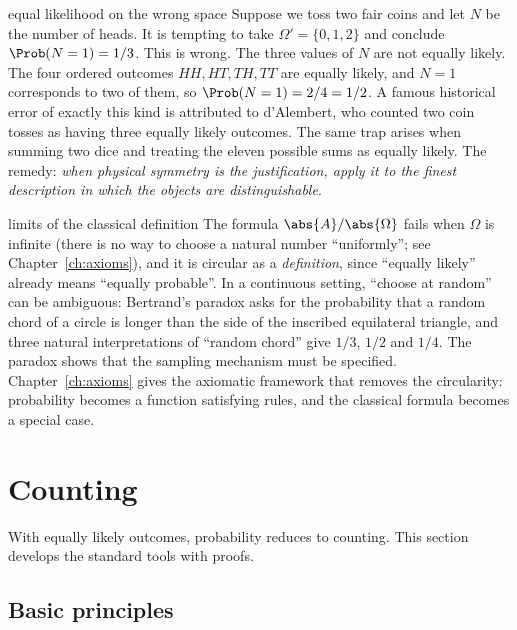 \begin{pitfall}{equal likelihood on the wrong space}
Suppose we toss two fair coins and let $N$ be the number of heads. It is
tempting to take $\Omega'=\{0,1,2\}$ and conclude $\Prob(N=1)=1/3$. This is
wrong. The three values of $N$ are not equally likely. The four ordered
outcomes $HH,HT,TH,TT$ are equally likely, and $N=1$ corresponds to two of
them, so $\Prob(N=1)=2/4=1/2$. A famous historical error of exactly this kind is
attributed to d'Alembert, who counted two coin tosses as having three
equally likely outcomes. The same trap arises when summing two dice and
treating the eleven possible sums as equally likely. The remedy: \emph{when physical symmetry is
the justification, apply it to the finest description in which the objects
are distinguishable}.
\end{pitfall}

\begin{nuance}{limits of the classical definition}
The formula $\abs{A}/\abs{\Omega}$ fails when $\Omega$ is infinite (there is no
way to choose a natural number ``uniformly''; see
Chapter~\ref{ch:axioms}), and it is circular as a \emph{definition}, since
``equally likely'' already means ``equally probable''. In a continuous
setting, ``choose at random'' can be ambiguous: Bertrand's paradox asks for the
probability that a random chord of a circle is longer than the side of the
inscribed equilateral triangle, and three natural interpretations of ``random
chord'' give $1/3$, $1/2$ and $1/4$. The paradox shows that the sampling
mechanism must be specified. Chapter~\ref{ch:axioms} gives the axiomatic
framework that removes the circularity: probability becomes a function
satisfying rules, and the classical formula becomes a special case.
\end{nuance}

\section{Counting}\label{sec:counting}

With equally likely outcomes, probability reduces to counting. This section
develops the standard tools with proofs.

\subsection{Basic principles}

